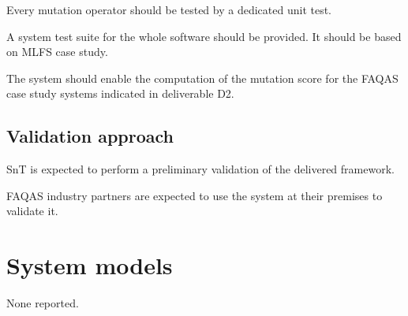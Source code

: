  \RQ{} Every mutation operator should be tested by a dedicated unit test.
 
 \RQ{} A system test suite for the whole software should be provided. It should be based on MLFS case study.
 
   \RQ{} The system should enable the computation of the mutation score for the FAQAS case study systems indicated in deliverable D2.
 
 \subsection{Validation approach}

\RQ{} SnT is expected to perform a preliminary validation of the delivered framework.

 \RQ{} FAQAS industry partners are expected to use the system at their premises to validate it.
 

%  
% 
%
% 
% 

 \section{System models}
 
 None reported.

